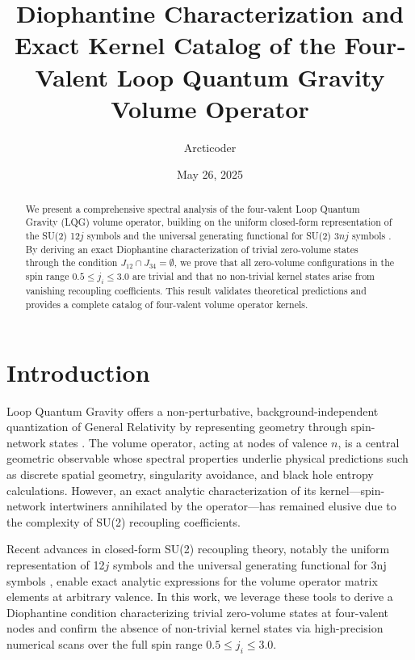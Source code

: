 \documentclass[11pt]{article}
\begin{document}
\title{Diophantine Characterization and Exact Kernel Catalog of the Four‐Valent Loop Quantum Gravity Volume Operator}
\author{Arcticoder}
\date{May 26, 2025}
\maketitle

\begin{abstract}
We present a comprehensive spectral analysis of the four-valent Loop Quantum Gravity (LQG) volume operator, building on the uniform closed-form representation of the SU(2) 12$j$ symbols \cite{Arcticoder2025Uniform12j} and the universal generating functional for SU(2) $3nj$ symbols \cite{Arcticoder2025Generating}. By deriving an exact Diophantine characterization of trivial zero-volume states through the condition $J_{12}\cap J_{34}=\emptyset$, we prove that all zero-volume configurations in the spin range $0.5\le j_i\le3.0$ are trivial and that no non-trivial kernel states arise from vanishing recoupling coefficients. This result validates theoretical predictions and provides a complete catalog of four-valent volume operator kernels.
\end{abstract}

\section{Introduction}
Loop Quantum Gravity offers a non-perturbative, background-independent quantization of General Relativity by representing geometry through spin-network states \cite{AshtekarLewandowski2004}. The volume operator, acting at nodes of valence $n$, is a central geometric observable whose spectral properties underlie physical predictions such as discrete spatial geometry, singularity avoidance, and black hole entropy calculations. However, an exact analytic characterization of its kernel—spin-network intertwiners annihilated by the operator—has remained elusive due to the complexity of SU(2) recoupling coefficients.

Recent advances in closed-form SU(2) recoupling theory, notably the uniform representation of 12$j$ symbols \cite{Arcticoder2025Uniform12j} and the universal generating functional for 3nj symbols \cite{Arcticoder2025Generating}, enable exact analytic expressions for the volume operator matrix elements at arbitrary valence. In this work, we leverage these tools to derive a Diophantine condition characterizing trivial zero-volume states at four-valent nodes and confirm the absence of non-trivial kernel states via high-precision numerical scans over the full spin range $0.5\le j_i\le3.0$.
\end{document}
